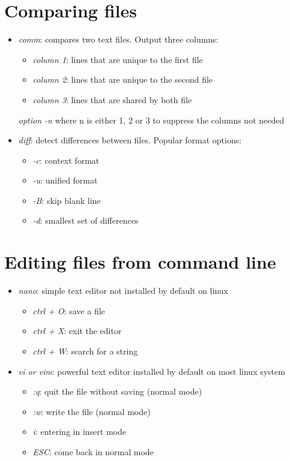 \documentclass[a4paper,12pts]{article}
\begin{document}
\section{Comparing files}
\begin{itemize}
    \item \textit{comm}: compares two text files. Output three columns:
        \begin{itemize}
            \item \textit{column 1}: lines that are unique to the first file
            \item \textit{column 2}: lines that are unique to the second file
            \item \textit{column 3}: lines that are shared by both file
        \end{itemize}
        \textit {option -n} where n is either 1, 2 or 3 to suppress the columns
        not needed
    \item \textit{diff}: detect differences between files. Popular format
        options:
        \begin{itemize}
            \item \textit{-c}: context format
            \item \textit{-u}: unified format
            \item \textit{-B}: skip blank line
            \item \textit{-d}: smallest set of differences
        \end{itemize}

\end{itemize}
\section{Editing files from command line}
\begin{itemize}
    \item \textit{nano}: simple text editor not installed by default on linux
        \begin{itemize}
            \item \textit{ctrl + O}: save a file
            \item \textit{ctrl + X}: exit the editor
            \item \textit{ctrl + W}: search for a string
        \end{itemize}
    \item \textit{vi or vim}: powerful text editor installed by default on most
        linux system
        \begin{itemize}
            \item \textit{:q}: quit the file without saving (normal mode)
            \item \textit{:w}: write the file (normal mode)
            \item \textit{i}: entering in insert mode
            \item \textit{ESC}: come back in normal mode


        \end{itemize}
\end{itemize}
\end{document}
